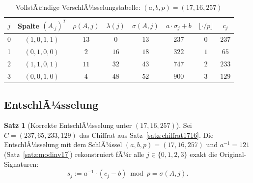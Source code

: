 ﻿\documentclass[a4paper,12pt]{scrreprt}
\theoremstyle{definition}
\newtheorem{satz}{Satz}[section]
\begin{document}
\begin{table}[H]
\centering
\caption{VollstÃ¤ndige VerschlÃ¼sselungstabelle: $(a,b,p) = (17,16,257)$}
\label{tab:enc1716}
\begin{tabular}{@{}cccccccc@{}}
\toprule
$j$ & Spalte $(A_{\cdot j})^T$ & $\rho(A,j)$ & $\lambda(j)$ & $\sigma(A,j)$ & $a \cdot \sigma_j + b$ & $\lfloor \cdot / p \rfloor$ & $c_j$ \\
\midrule
0 & $(1,0,1,1)$ & $13$ & $0$  & $13$ & $237$ & $0$ & $237$ \\
1 & $(0,1,0,0)$ & $2$  & $16$ & $18$ & $322$ & $1$ & $65$  \\
2 & $(1,1,0,1)$ & $11$ & $32$ & $43$ & $747$ & $2$ & $233$ \\
3 & $(0,0,1,0)$ & $4$  & $48$ & $52$ & $900$ & $3$ & $129$ \\
\bottomrule
\end{tabular}
\end{table}

\subsection{EntschlÃ¼sselung}

\begin{satz}[Korrekte EntschlÃ¼sselung unter $(17, 16, 257)$]
\label{satz:dec1716}
Sei $C = (237, 65, 233, 129)$ das Chiffrat aus Satz~\ref{satz:chiffrat1716}. Die EntschlÃ¼sselung mit dem SchlÃ¼ssel $(a, b, p) = (17, 16, 257)$ und $a^{-1} = 121$ (Satz~\ref{satz:modinv17}) rekonstruiert fÃ¼r alle $j \in \{0,1,2,3\}$ exakt die Original-Signaturen:
\[
s_j := a^{-1} \cdot (c_j - b) \bmod p = \sigma(A,j).
\]
\end{satz}
\end{document}
